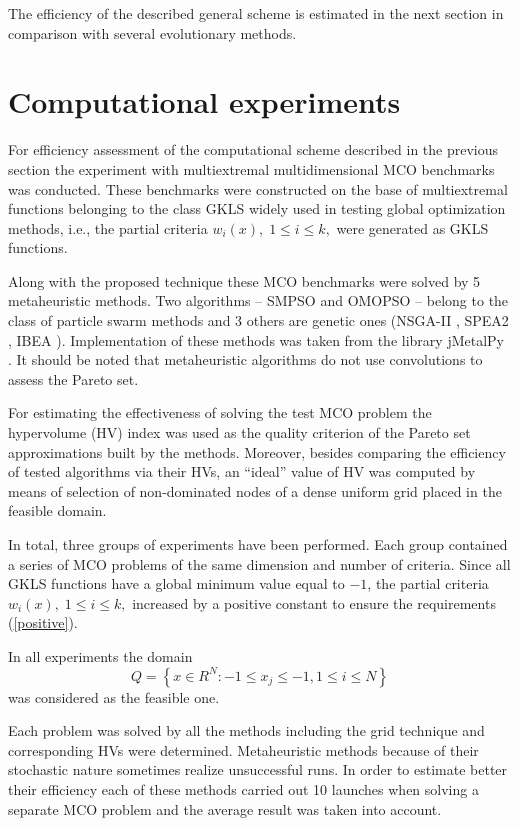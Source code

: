 \documentclass[]{interact}
\theoremstyle{plain}%
\theoremstyle{definition}
\theoremstyle{remark}
\begin{document}
The efficiency of the described general scheme is estimated in the next section in comparison with several evolutionary methods. 

\section{Computational experiments}

For efficiency assessment of the computational scheme described in the previous section the experiment with multiextremal multidimensional MCO benchmarks was conducted. These benchmarks were constructed on the base of multiextremal functions belonging to the class GKLS \cite{Gaviano2003} widely used in testing global optimization methods, i.e., the partial criteria $w_i(x), \; 1 \leq i \leq k,$ were generated as GKLS functions.

Along with the proposed technique these MCO benchmarks were solved by 5 metaheuristic methods. Two algorithms -- SMPSO \cite{Nebro2009} and OMOPSO \cite{Durillo2010} -- belong to the class of particle swarm methods and 3 others are genetic ones (NSGA-II \cite{Deb2002}, SPEA2 \cite{Zitzler2001}, IBEA \cite{Zitzler2004}). Implementation of these methods was taken from the library jMetalPy \cite{Benitez2019}. It should be noted that metaheuristic algorithms do not use convolutions to assess the Pareto set.

For estimating the effectiveness of solving the test MCO problem the hypervolume (HV) index  \cite{} was used as the quality criterion of the Pareto set approximations built by the methods. Moreover, besides comparing the efficiency of tested algorithms via their HVs, an ``ideal'' value of HV was computed by means of selection of non-dominated nodes of a dense uniform grid placed in the feasible domain.

In total, three groups of experiments have been performed. Each group contained a series of MCO problems of the same dimension and number of criteria. Since all GKLS functions have a global minimum value equal to $-1$, the partial  criteria $w_i(x), \; 1 \leq i \leq k,$  increased by a positive constant to ensure the requirements (\ref{positive}).

In all experiments the domain
\[
Q = \left\{x \in R^N : -1 \leq x_j \leq -1, 1 \leq i \leq N \right\}
\]
was considered as the feasible one. 

Each problem was solved by all the methods including the grid technique and corresponding HVs were determined.  Metaheuristic methods because of their stochastic nature sometimes realize unsuccessful runs. In order to estimate better their efficiency each of these methods carried out 10 launches when solving a separate MCO problem and the average result was taken into account.
\end{document}
